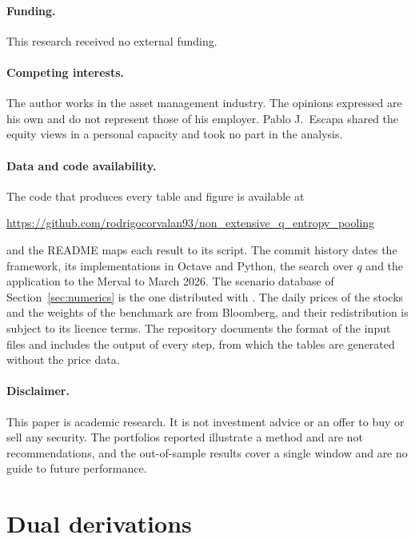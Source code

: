 \documentclass[11pt]{article}
\begin{document}
\paragraph{Funding.} This research received no external funding.

\paragraph{Competing interests.} The author works in the asset management
industry. The opinions expressed are his own and do not represent those of
his employer. Pablo J.~Escapa shared the equity views in a personal
capacity and took no part in the analysis.

\paragraph{Data and code availability.} The code that produces every table
and figure is available at
\begin{center}
\url{https://github.com/rodrigocorvalan93/non_extensive_q_entropy_pooling}
\end{center}
and the README maps each result to its script. The commit history dates
the framework, its implementations in Octave and Python, the search over
$q$ and the application to the Merval to March 2026. The scenario database of
Section~\ref{sec:numerics} is the one distributed with
\citet{Meucci2008}. The daily prices of the stocks and the weights of the
benchmark are from Bloomberg, and their redistribution is subject to its
licence terms. The repository documents the format of the input files and
includes the output of every step, from which the tables are generated
without the price data.

\paragraph{Disclaimer.} This paper is academic research. It is not
investment advice or an offer to buy or sell any security. The portfolios
reported illustrate a method and are not recommendations, and the
out-of-sample results cover a single window and are no guide to future
performance.

\appendix
\section{Dual derivations}\label{app:dual}
\end{document}
